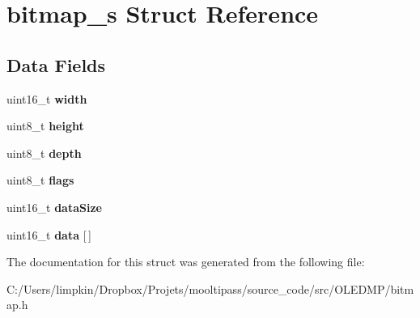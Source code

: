 \hypertarget{structbitmap__s}{\section{bitmap\+\_\+s Struct Reference}
\label{structbitmap__s}
}
\subsection*{Data Fields}
\begin{DoxyCompactItemize}
\item 
\hypertarget{structbitmap__s_ad0eab1042455a2067c812ab8071d5376}{uint16\+\_\+t {\bfseries width}}\label{structbitmap__s_ad0eab1042455a2067c812ab8071d5376}

\item 
\hypertarget{structbitmap__s_adcf201a8aabf55cb352ec05331242594}{uint8\+\_\+t {\bfseries height}}\label{structbitmap__s_adcf201a8aabf55cb352ec05331242594}

\item 
\hypertarget{structbitmap__s_ab6f276082172be43a6041212071e377b}{uint8\+\_\+t {\bfseries depth}}\label{structbitmap__s_ab6f276082172be43a6041212071e377b}

\item 
\hypertarget{structbitmap__s_aa2585d779da0ab21273a8d92de9a0ebe}{uint8\+\_\+t {\bfseries flags}}\label{structbitmap__s_aa2585d779da0ab21273a8d92de9a0ebe}

\item 
\hypertarget{structbitmap__s_afe5dbe9ff0f4a3d528fdd0697ad730eb}{uint16\+\_\+t {\bfseries data\+Size}}\label{structbitmap__s_afe5dbe9ff0f4a3d528fdd0697ad730eb}

\item 
\hypertarget{structbitmap__s_a150379680c51ad51c2ffc0c53c051d9f}{uint16\+\_\+t {\bfseries data} \mbox{[}$\,$\mbox{]}}\label{structbitmap__s_a150379680c51ad51c2ffc0c53c051d9f}

\end{DoxyCompactItemize}


The documentation for this struct was generated from the following file\+:\begin{DoxyCompactItemize}
\item 
C\+:/\+Users/limpkin/\+Dropbox/\+Projets/mooltipass/source\+\_\+code/src/\+O\+L\+E\+D\+M\+P/bitmap.\+h\end{DoxyCompactItemize}
